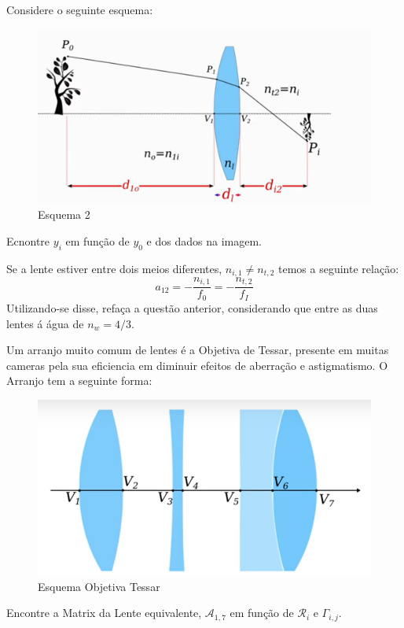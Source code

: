 \documentclass[11pt]{article}
\begin{document}
\begin{pproblem}
\begin{alternativas}
            \item Considere o seguinte esquema:
                \begin{figure}[H]
                    \centering
                    \includegraphics[width=0.9\linewidth]{imagens/lentes2.png}
                    \caption{Esquema 2}
                \end{figure}
                 Ecnontre \(y_i\) em função de \(y_0\) e dos dados na imagem.
                 
            \item Se a lente estiver entre dois meios diferentes, \(n_{i,1} \ne n_{t,2}\) temos a seguinte relação:
            \[a_{12} = -\frac{n_{i,1}}{f_0}=-\frac{n_{t,2}}{f_I}\]
                Utilizando-se disse, refaça a questão anterior, considerando que entre as duas lentes á água de \(n_w = 4/3\).
        
            \item Um arranjo muito comum de lentes é a Objetiva de Tessar, presente em muitas cameras pela sua eficiencia em diminuir efeitos de aberração e astigmatismo. O Arranjo tem a seguinte forma:
                \begin{figure}[H]
                    \centering
                    \includegraphics[width=0.7\linewidth]{imagens/lentes3.png}
                    \caption{Esquema Objetiva Tessar}
                \end{figure}
                Encontre a Matrix da Lente equivalente, \(\mathcal{A}_{1,7}\) em função de \(\mathcal{R}_i\) e \(\Gamma_{i,j}\).
        \end{alternativas}
    

\end{pproblem}
\end{document}

